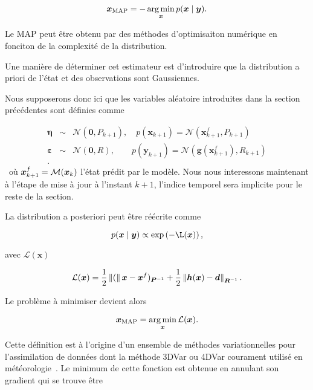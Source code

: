 \begin{equation*}
    \bm x_{\text{MAP}} = - \operatorname*{arg\,min}_{\bm x} p(\bm x \mid \bm y).
\end{equation*}

Le MAP peut être obtenu par des méthodes d'optimisaiton numérique en fonciton de la complexité de la distribution.

Une manière de déterminer cet estimateur est d'introduire que la distribution a priori de l'état et des observations sont Gaussiennes.

Nous supposerons donc ici que les variables aléatoire introduites dans la section précédentes sont définies comme

\begin{eqnarray*}
    \bm \eta &\sim& \mathcal{N}(\bm 0, P_{k+1}), \quad p(\bm x_{k+1}) = \mathcal{N}(\bm x_{k+1}^f, P_{k+1})\\
    \bm \varepsilon & \sim & \mathcal N(\bm 0, R), \quad \quad p(\bm y_{k+1}) = \mathcal{N}(\bm g(\bm x_{k+1}^f) , R_{k+1})\\.
\end{eqnarray*}~où $\bm x_{k+1}^f = \mathcal{M}(\bm{x}_{k})$ l'état prédit par le modèle. Nous nous interessons maintenant à l'étape de mise à jour à l'instant $k+1$, l'indice temporel sera implicite pour le reste de la section.

La distribution a posteriori peut être réécrite comme

\begin{equation*}
    p(\bm x \mid \bm y) \propto \exp\left(- \mathcal{\L}(\bm x)\right),
\end{equation*}

avec $\mathcal L(\bm x)$

\begin{equation*}
    \mathcal L(\bm x) = \frac12 \left\lVert ( \right\rVert\bm x - \bm x^f)_{ \bm{P}^{-1}} + \frac12 \left\lVert \bm h(\bm x) - \bm d \right\rVert_{\bm{R}^{-1}}.
\end{equation*}

Le problème à minimiser devient alors

\begin{equation*}
    \bm x_{\text{MAP}} = \operatorname*{arg\,min}_{\bm x} \mathcal L(\bm x).
\end{equation*}

Cette définition est à l'origine d'un ensemble de méthodes variationnelles pour l'assimilation de données dont la méthode 3DVar ou 4DVar courament utilisé en météorologie~\cite{talagrand1997assimilation}.
Le minimum de cette fonction est obtenue en annulant son gradient qui se trouve être

